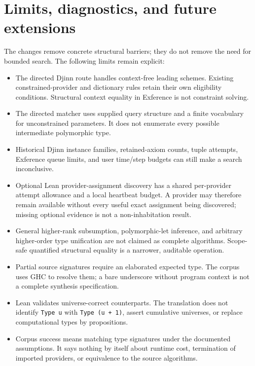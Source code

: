 \documentclass[11pt]{article}
\newcommand{\code}[1]{\texttt{#1}}
\begin{document}
\clearpage
\section{Limits, diagnostics, and future extensions}

The changes remove concrete structural barriers; they do not remove the need
for bounded search. The following limits remain explicit:
\begin{itemize}
  \item The directed Djinn route handles context-free leading schemes.
    Existing constrained-provider and dictionary rules retain their own
    eligibility conditions. Structural context equality in Exference is not
    constraint solving.
  \item The directed matcher uses supplied query structure and a finite
    vocabulary for unconstrained parameters. It does not enumerate every
    possible intermediate polymorphic type.
  \item Historical Djinn instance families, retained-axiom counts, tuple
    attempts, Exference queue limits, and user time/step budgets can still make
    a search inconclusive.
  \item Optional Lean provider-assignment discovery has a shared per-provider
    attempt allowance and a local heartbeat budget. A provider may therefore
    remain available without every useful exact assignment being discovered;
    missing optional evidence is not a non-inhabitation result.
  \item General higher-rank subsumption, polymorphic-let inference, and
    arbitrary higher-order type unification are not claimed as complete
    algorithms. Scope-safe quantified structural equality is a narrower,
    auditable operation.
  \item Partial source signatures require an elaborated expected type. The
    corpus uses GHC to resolve them; a bare underscore without program context
    is not a complete synthesis specification.
  \item Lean validates universe-correct counterparts. The translation does
    not identify \code{Type u} with \code{Type (u + 1)}, assert cumulative
    universes, or replace computational types by propositions.
  \item Corpus success means matching type signatures under the documented
    assumptions. It says nothing by itself about runtime cost, termination of
    imported providers, or equivalence to the source algorithms.
\end{itemize}
\end{document}
